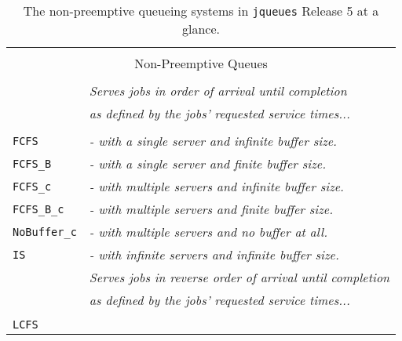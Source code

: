 \begin{table}[!htbp]
	\label{tab:non-preemptive-queues}
	\caption{The non-preemptive queueing systems
             in \texttt{jqueues} Release 5
             at a glance.}
	\begin{center}
		\begin{tabular}{|l|l|}
			\hline
			\multicolumn{2}{|c|}{} \\
			\multicolumn{2}{|c|}{Non-Preemptive Queues} \\
			\multicolumn{2}{|c|}{} \\
			\hline
            \hline
              &
              {\em Serves jobs
                   in order of arrival
                   until completion}
              \\
              &
              {\em as defined by the jobs'
                   requested service times...}
              \\
              &
              \\
			\lstinline|FCFS|
              &
              {\em - with a single server
                     and infinite buffer size.}
              \\
			\lstinline|FCFS_B|
              &
              {\em - with a single server
                     and finite buffer size.}
              \\
			\lstinline|FCFS_c|
              &
              {\em - with multiple servers
                     and infinite buffer size.}
              \\
			\lstinline|FCFS_B_c|
              &
              {\em - with multiple servers
                     and finite buffer size.}
              \\
			\lstinline|NoBuffer_c|
              &
              {\em - with multiple servers
                     and no buffer at all.}
              \\
			\lstinline|IS|
              &
              {\em - with infinite servers
                     and infinite buffer size.}
              \\
            \hline
              &
              {\em Serves jobs
                   in reverse order of arrival
                   until completion}
              \\
              &
              {\em as defined by the jobs'
                   requested service times...}
              \\
              &
              \\
			\lstinline|LCFS|
              &

\end{tabular}
\end{center}
\end{table}
